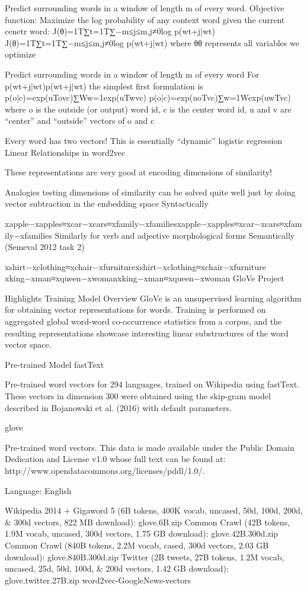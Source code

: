 Predict surrounding words in a window of length m of every word.
Objective function: Maximize the log probability of any context word given the current cenetr word:
J(θ)=1T∑t=1T∑−m≤j≤m,j≠0log p(wt+j|wt)
J(θ)=1T∑t=1T∑−m≤j≤m,j≠0log p(wt+j|wt)
where θθ represents all variables we optimize

Predict surrounding words in a window of length m of every word
For p(wt+j|wt)p(wt+j|wt) the simplest first formulation is
p(o|c)=exp(uTovc)∑Ww=1exp(uTwvc)
p(o|c)=exp(uoTvc)∑w=1Wexp(uwTvc)
where o is the outside (or output) word id, c is the center word id, u and v are “center” and “outside” vectors of o and c

Every word has two vectors!
This is essentially “dynamic” logistic regression
Linear Relationships in word2vec

These representations are very good at encoding dimensions of similarity!

Analogies testing dimensions of similarity can be solved quite well just by doing vector subtraction in the embedding space
Syntactically

xapple−xapples≈xcar−xcars≈xfamily−xfamiliesxapple−xapples≈xcar−xcars≈xfamily−xfamilies
Similarly for verb and adjective morphological forms
Semantically (Semeval 2012 task 2)

xshirt−xclothing≈xchair−xfurniturexshirt−xclothing≈xchair−xfurniture
xking−xman≈xqueen−xwomanxking−xman≈xqueen−xwoman
GloVe
Project

Highlights
Training
Model Overview
GloVe is an unsupervised learning algorithm for obtaining vector representations for words. Training is performed on aggregated global word-word co-occurrence statistics from a corpus, and the resulting representations showcase interesting linear substructures of the word vector space.

Pre-trained Model
fastText

Pre-trained word vectors for 294 languages, trained on Wikipedia using fastText. These vectors in dimension 300 were obtained using the skip-gram model described in Bojanowski et al. (2016) with default parameters.

glove

Pre-trained word vectors. This data is made available under the Public Domain Dedication and License v1.0 whose full text can be found at: http://www.opendatacommons.org/licenses/pddl/1.0/.

Language: English

Wikipedia 2014 + Gigaword 5 (6B tokens, 400K vocab, uncased, 50d, 100d, 200d, & 300d vectors, 822 MB download): glove.6B.zip
Common Crawl (42B tokens, 1.9M vocab, uncased, 300d vectors, 1.75 GB download): glove.42B.300d.zip
Common Crawl (840B tokens, 2.2M vocab, cased, 300d vectors, 2.03 GB download): glove.840B.300d.zip
Twitter (2B tweets, 27B tokens, 1.2M vocab, uncased, 25d, 50d, 100d, & 200d vectors, 1.42 GB download): glove.twitter.27B.zip
word2vec-GoogleNews-vectors

